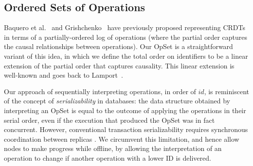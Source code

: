 \subsection{Ordered Sets of Operations}

Baquero et al.~\cite{Baquero:2014ed} and Grishchenko~\cite{Grishchenko:2014eh} have previously proposed representing CRDTs in terms of a partially-ordered log of operations (where the partial order captures the causal relationships between operations).
Our OpSet is a straightforward variant of this idea, in which we define the total order on identifiers to be a linear extension of the partial order that captures causality.
This linear extension is well-known and goes back to Lamport~\cite{Lamport:1978jq}.

Our approach of sequentially interpreting operations, in order of $\mathit{id}$, is reminiscent of the concept of \emph{serializability} in databases: the data structure obtained by interpreting an OpSet is equal to the outcome of applying the operations in their serial order, even if the execution that produced the OpSet was in fact concurrent.
However, conventional transaction serializability requires synchronous coordination between replicas \cite{Davidson:1985hv}.
We circumvent this limitation, and hence allow nodes to make progress while offline, by allowing the interpretation of an operation to change if another operation with a lower ID is delivered.
